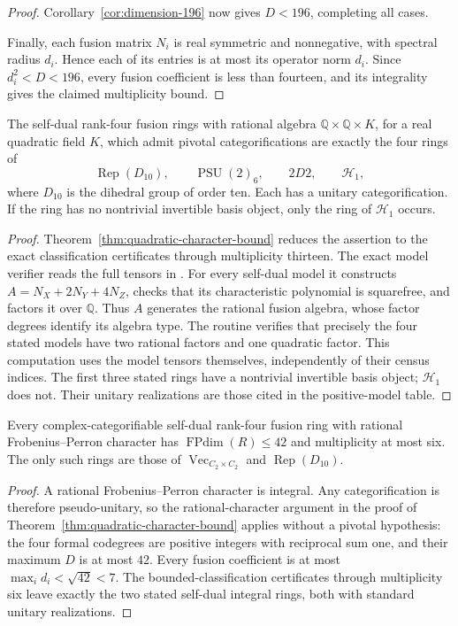 \begin{proof}
Corollary~\ref{cor:dimension-196} now gives $D<196$, completing all cases.

Finally, each fusion matrix $N_i$ is real symmetric and nonnegative, with
spectral radius $d_i$. Hence each of its entries is at most its operator
norm $d_i$. Since $d_i^2<D<196$, every fusion coefficient is less than
fourteen, and its integrality gives the claimed multiplicity bound.
\end{proof}

\begin{corollary}\label{cor:quadratic-character-classification}
The self-dual rank-four fusion rings with rational algebra
$\mathbb Q\times\mathbb Q\times K$, for a real quadratic field $K$,
which admit pivotal categorifications are exactly the four rings of
\[
 \operatorname{Rep}(D_{10}),\qquad
 \operatorname{PSU}(2)_6,\qquad 2D2,\qquad\mathcal H_1,
\]
where $D_{10}$ is the dihedral group of order ten. Each has a unitary
categorification. If the ring has no nontrivial invertible basis object,
only the ring of $\mathcal H_1$ occurs.
\end{corollary}
\begin{proof}
Theorem~\ref{thm:quadratic-character-bound} reduces the assertion to the
exact classification certificates through multiplicity thirteen.
The exact model verifier reads the full tensors in
. For every self-dual model it constructs
$A=N_X+2N_Y+4N_Z$, checks that its characteristic polynomial is
squarefree, and factors it over $\mathbb Q$. Thus $A$ generates
the rational fusion algebra, whose factor degrees identify its
algebra type. The routine
verifies that precisely the four stated models have two rational
factors and one quadratic factor. This computation uses the model
tensors themselves, independently of their census indices.
The first three stated rings have a nontrivial invertible basis
object; $\mathcal H_1$ does not. Their unitary realizations are
those cited in the positive-model table.
\end{proof}

\begin{corollary}\label{cor:integral-selfdual-rank4}
Every complex-categorifiable self-dual rank-four fusion ring with rational
Frobenius--Perron character has $\operatorname{FPdim}(R)\leq42$ and
multiplicity at most six. The only such rings are those of
$\operatorname{Vec}_{C_2\times C_2}$ and $\operatorname{Rep}(D_{10})$.
\end{corollary}
\begin{proof}
A rational Frobenius--Perron character is integral. Any categorification is
therefore pseudo-unitary, so the rational-character argument in the proof
of Theorem~\ref{thm:quadratic-character-bound} applies without a pivotal
hypothesis: the four formal codegrees are positive integers with reciprocal
sum one, and their maximum $D$ is at most $42$. Every fusion coefficient
is at most $\max_i d_i<\sqrt{42}<7$. The bounded-classification
certificates through multiplicity six leave exactly the two stated
self-dual integral rings, both with standard unitary realizations.
\end{proof}

